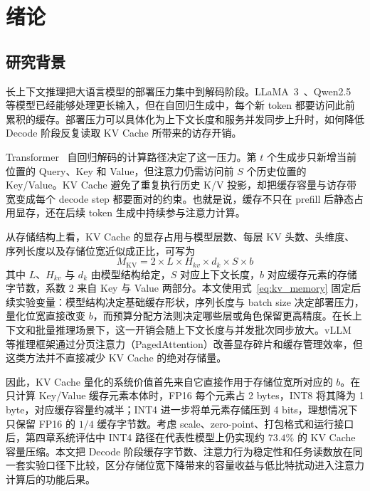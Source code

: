 \chapter{绪论}

\section{研究背景}

长上下文推理把大语言模型的部署压力集中到解码阶段。LLaMA~3~\cite{grattafiori2024llama3}、Qwen2.5~\cite{qwen2025qwen25} 等模型已经能够处理更长输入，但在自回归生成中，每个新 token 都要访问此前累积的缓存。部署压力可以具体化为上下文长度和服务并发同步上升时，如何降低 Decode 阶段反复读取 KV Cache 所带来的访存开销。

Transformer~\cite{vaswani2017attention} 自回归解码的计算路径决定了这一压力。第 $t$ 个生成步只新增当前位置的 Query、Key 和 Value，但注意力仍需访问前 $S$ 个历史位置的 Key/Value。KV Cache 避免了重复执行历史 K/V 投影，却把缓存容量与访存带宽变成每个 decode step 都要面对的约束。也就是说，缓存不只在 prefill 后静态占用显存，还在后续 token 生成中持续参与注意力计算。

从存储结构上看，KV Cache 的显存占用与模型层数、每层 KV 头数、头维度、序列长度以及存储位宽近似成正比，可写为
\begin{equation}
  M_{\mathrm{KV}} = 2 \times L \times H_{kv} \times d_k \times S \times b
  \label{eq:kv_memory}
\end{equation}
其中 $L$、$H_{kv}$ 与 $d_k$ 由模型结构给定，$S$ 对应上下文长度，$b$ 对应缓存元素的存储字节数，系数 2 来自 Key 与 Value 两部分。本文使用式~\eqref{eq:kv_memory} 固定后续实验变量：模型结构决定基础缓存形状，序列长度与 batch size 决定部署压力，量化位宽直接改变 $b$，而预算分配方法则决定哪些层或角色保留更高精度。在长上下文和批量推理场景下，这一开销会随上下文长度与并发批次同步放大。vLLM~\cite{kwon2023vllm} 等推理框架通过分页注意力（PagedAttention）改善显存碎片和缓存管理效率，但这类方法并不直接减少 KV Cache 的绝对存储量。

因此，KV Cache 量化的系统价值首先来自它直接作用于存储位宽所对应的 $b$。在只计算 Key/Value 缓存元素本体时，FP16 每个元素占 2 bytes，INT8 将其降为 1 byte，对应缓存容量约减半；INT4 进一步将单元素存储压到 4 bits，理想情况下只保留 FP16 的 $1/4$ 缓存字节数。考虑 scale、zero-point、打包格式和运行接口后，第四章系统评估中 INT4 路径在代表性模型上仍实现约 $73.4\%$ 的 KV Cache 容量压缩。本文把 Decode 阶段缓存字节数、注意力行为稳定性和任务读数放在同一套实验口径下比较，区分存储位宽下降带来的容量收益与低比特扰动进入注意力计算后的功能后果。


